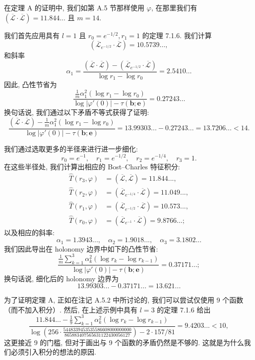 \begin{example}\label{ex:7.4.6}
在定理 A 的证明中, 我们如第 A.5 节那样使用 \(\varphi\), 
在那里我们有 \((\overline{\mathcal{L}} \cdot \overline{\mathcal{L}}) = 11.844...\) 且 \(m = 14\).

我们首先应用具有 \(l=1\) 且 \(r_0=e^{-1/2}, r_1=1\) 的定理 7.1.6. 我们计算
\[ (\overline{\mathcal{L}}_{e^{-1/2}} \cdot \overline{\mathcal{L}}) = 10.5739 \dots, \]
和斜率
\[ \alpha_1 = \frac{(\overline{\mathcal{L}} \cdot \overline{\mathcal{L}}) - (\overline{\mathcal{L}}_{e^{-1/2}} \cdot \overline{\mathcal{L}})}{\log r_1 - \log r_0} = 2.5410 \dots \]
因此, 凸性节省为
\[ \frac{\frac{1}{m}\alpha_1^2(\log r_1 - \log r_0)}{\log|\varphi'(0)| - \tau(\mathbf{b}; \mathbf{e})} = 0.27243\dots \]
换句话说, 我们通过以下矛盾不等式获得了证明:
\begin{equation}\label{eq:7.4.7}
\frac{\left(\overline{\mathcal{L}} \cdot \overline{\mathcal{L}}\right) - \frac{1}{m}\alpha_1^2(\log r_1 - \log r_0)}{\log|\varphi'(0)| - \tau(\mathbf{b}; \mathbf{e})} = 13.99303... - 0.27243... = 13.7206... < 14.
\end{equation}

我们通过选取更多的半径来进行进一步细化:
\[ r_0 = e^{-1}, \quad r_1 = e^{-1/2}, \quad r_2 = e^{-1/4}, \quad r_3 = 1. \]
在这些半径处, 我们计算出相应的 Bost--Charles 特征积分:
\[
\begin{aligned}
\widehat{T}(r_3, \varphi) &= (\overline{\mathcal{L}}, \overline{\mathcal{L}}) = 11.844..., \\
\widehat{T}(r_2, \varphi) &= (\overline{\mathcal{L}}_{e^{-1/4}} \cdot \overline{\mathcal{L}}) = 11.049..., \\
\widehat{T}(r_1, \varphi) &= (\overline{\mathcal{L}}_{e^{-1/2}} \cdot \overline{\mathcal{L}}) = 10.573..., \\
\widehat{T}(r_0, \varphi) &= (\overline{\mathcal{L}}_{e^{-1}} \cdot \overline{\mathcal{L}}) = 9.8766...;
\end{aligned}
\]
以及相应的斜率:
\[ \alpha_1 = 1.3943..., \quad \alpha_2 = 1.9018..., \quad \alpha_3 = 3.1802... \]
我们因此导出在 holonomy 边界中如下的凸性节省:
\[ \frac{\frac{1}{m} \sum_{k=1}^{3} \alpha_k^2 (\log r_k - \log r_{k-1})}{\log |\varphi'(0)| - \tau(\mathbf{b}; \mathbf{e})} = 0.37171\dots; \]
换句话说, 细化后的 holonomy 边界为
\begin{equation}\label{eq:7.4.8}
13.99303... - 0.37171... = 13.621...
\end{equation}
\end{example}

\begin{example}\label{ex:7.4.9}
为了证明定理 A, 正如在注记 A.5.2 中所讨论的, 
我们可以尝试仅使用 9 个函数（而不加入积分）. 
然后, 在上述示例中具有 \(l = 3\) 的定理 7.1.6 给出
\[ \frac{11.844...-\frac{1}{9}\sum_{k=1}^{3}\alpha_{k}^{2}(\log r_{k}-\log r_{k-1})}{\log\left(256\cdot\frac{5448339453535586608000000000}{865883407565631122430056127}\right)-2\cdot157/81}=9.4203...<10, \]
这更接近 9 的门槛, 但对于画出与 9 个函数的矛盾仍然是不够的. 
这就是为什么我们必须引入积分的想法的原因. 
\end{example}

